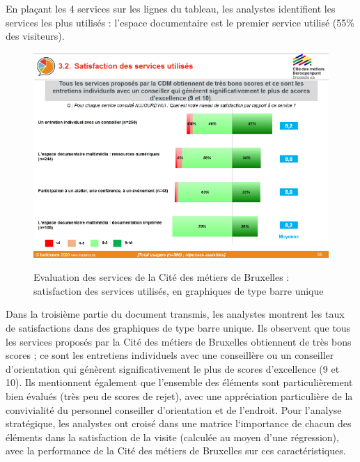 \documentclass[french,a4paper,12pt]{article}
\begin{document}
{\quad En plaçant les 4 services sur les lignes du tableau, les analystes identifient les services les plus utilisés : l’espace documentaire est le premier service utilisé (55\% des visiteurs).

\begin{center}
\begin{figure}
\includegraphics[scale=1.5]{9-cdm-satisfaction.PNG}
\end{figure}
\begin{figure}[h]
\caption{Evaluation des services de la Cité des métiers de Bruxelles :  satisfaction des services utilisés, en graphiques de type barre unique}
\end{figure}
\end{center}

\quad Dans la troisième partie du document transmis, les analystes montrent les taux de satisfactions dans des graphiques de type barre unique. Ils observent que tous les services proposés par la Cité des métiers de Bruxelles obtiennent de très bons scores ; ce sont les entretiens individuels avec une conseillère ou un conseiller d’orientation qui génèrent significativement le plus de scores d’excellence (9 et 10). Ils mentionnent également que l’ensemble des éléments sont particulièrement bien évalués (très peu de scores de rejet), avec une appréciation particulière de la convivialité du personnel conseiller d’orientation et de l’endroit.
Pour l’analyse stratégique, les analystes ont croisé dans une matrice l‘importance de chacun des éléments dans la satisfaction de la visite (calculée au moyen d’une régression), avec la performance de la Cité des métiers de Bruxelles sur ces caractéristiques. 

}
\end{document}
